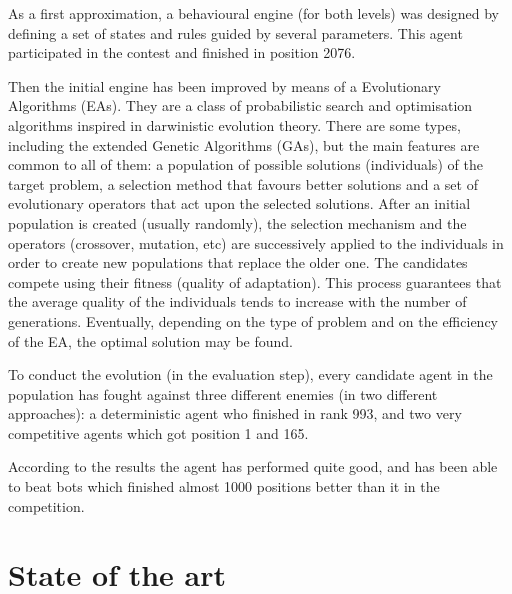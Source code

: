 \documentclass[runningheads]{llncs}
\begin{document}
As a first approximation, a behavioural engine (for both levels) was designed by defining a set of states and rules guided by several parameters. This agent participated in the contest and finished in position 2076. %

Then the initial engine has been improved by means of a Evolutionary Algorithms (EAs)\cite{INTROEIBEN}. They are a class of probabilistic search and optimisation algorithms inspired in darwinistic evolution theory. 
There are some types, including the extended Genetic Algorithms (GAs)\cite{GA_Goldberg89}, but the main features are common to all of them: a population of possible solutions (individuals) of the target problem, a selection method that favours better solutions and a set of evolutionary operators that act upon the selected solutions.
After an initial population is created (usually randomly), the selection mechanism and the operators (crossover, mutation, etc) are successively applied to the individuals in order to create new populations that replace the older one. The candidates compete using their fitness (quality of adaptation). This process guarantees that the average quality of the individuals tends to increase with the number of generations. Eventually, depending on the type of problem and on the efficiency of the EA, the optimal solution may be found.


To conduct the evolution (in the evaluation step), every candidate agent in the population has fought against three different enemies (in two different approaches): a deterministic agent who finished in rank 993,
and two very competitive agents which got position 1 and 165.

According to the results the agent has performed quite good, and has been able to beat bots which finished almost 1000 positions better than it in the competition.





\section{State of the art}
\label{sec:soa}
\end{document}
